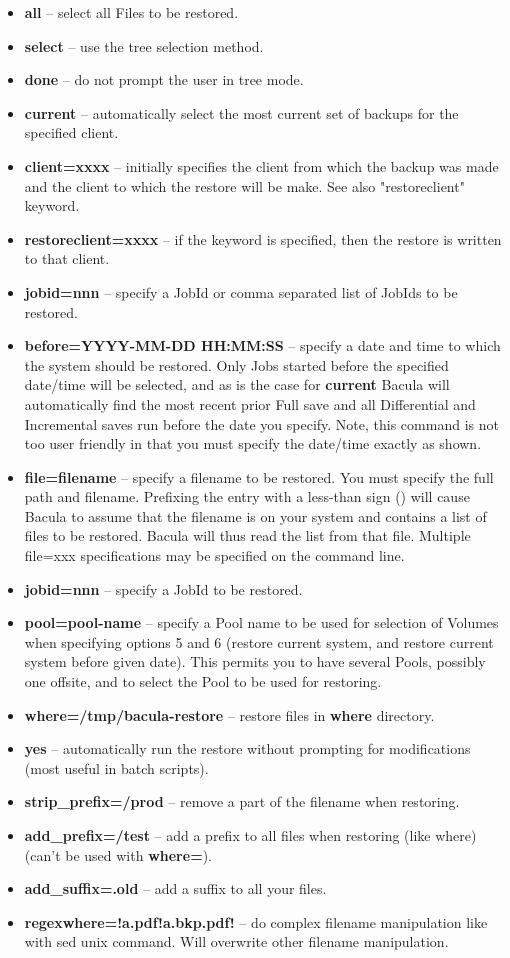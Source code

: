 \begin{itemize}
\item {\bf all} -- select all Files to be restored.  
\item {\bf select} -- use the tree selection method.  
\item {\bf done} -- do not prompt the user in tree mode.  
\item {\bf current} -- automatically select the most current set of  backups
   for the specified client.  
\item {\bf client=xxxx} -- initially specifies the client from which the
   backup was made and the client to which the restore will be make.  See also
   "restoreclient" keyword.
\item {\bf restoreclient=xxxx} -- if the keyword is specified, then the
   restore is written to that client.
\item {\bf jobid=nnn} -- specify a JobId or comma separated list of  JobIds to
   be restored.  
\item {\bf before=YYYY-MM-DD HH:MM:SS} -- specify a date and time to  which
   the system should be restored. Only Jobs started before  the specified
   date/time will be selected, and as is the case  for {\bf current} Bacula will
   automatically find the most  recent prior Full save and all Differential and
   Incremental  saves run before the date you specify. Note, this command is  not
   too user friendly in that you must specify the date/time  exactly as shown. 
\item {\bf file=filename} -- specify a filename to be restored. You  must
   specify the full path and filename. Prefixing the entry  with a less-than
   sign
   (\lt{}) will cause Bacula to assume that the  filename is on your system and
   contains a list of files to be  restored. Bacula will thus read the list from
   that file. Multiple  file=xxx specifications may be specified on the command
   line. 
\item {\bf jobid=nnn} -- specify a JobId to be restored. 
\item {\bf pool=pool-name} -- specify a Pool name to be used for selection  of
   Volumes when specifying options 5 and 6 (restore current system,  and restore
   current system before given date). This permits you to  have several Pools,
   possibly one offsite, and to select the Pool to  be used for restoring.  
\item {\bf where=/tmp/bacula-restore} -- restore files in {\bf where} directory.
\item {\bf yes} -- automatically run the restore without prompting  for
   modifications (most useful in batch scripts). 
\item {\bf strip\_prefix=/prod} -- remove a part of the filename when restoring.
\item {\bf add\_prefix=/test} -- add a prefix to all files when restoring (like
  where) (can't be used with {\bf where=}).
\item {\bf add\_suffix=.old} -- add a suffix to all your files.
\item {\bf regexwhere=!a.pdf!a.bkp.pdf!} -- do complex filename manipulation
  like with sed unix command. Will overwrite other filename manipulation.
\end{itemize}

